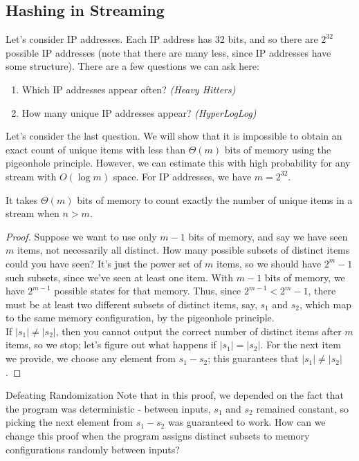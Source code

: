 \documentclass{notes}
\begin{document}
\subsection{Hashing in Streaming}
Let's consider IP addresses. Each IP address has 32 bits, and so there are $2^{32}$ possible IP addresses
(note that there are many less, since IP addresses have some structure). There are a few questions we
can ask here:

\begin{enumerate}[itemsep=0em]
  \item Which IP addresses appear often? \emph{(Heavy Hitters)} 
  \item How many unique IP addresses appear? \emph{(HyperLogLog)} 
\end{enumerate}

Let's consider the last question. We will show that it is impossible to obtain an exact count of unique 
items with less than $\Theta(m)$ bits of memory using the pigeonhole principle. However, we can estimate this
with high probability for any stream with $O(\log{m})$ space. For IP addresses, we have $m = 2^{32}$. 

\begin{proposition}
  It takes $\Theta(m)$ bits of memory to count exactly the number of unique items in a stream when 
  $n > m$.
\end{proposition}
\begin{proof}
  Suppose we want to use only $m-1$ bits of memory, and say we have seen $m$ items, not necessarily 
  all distinct. How many possible subsets of distinct items could you have seen? It's just the power
  set of $m$ items, so we should have $2^m - 1$ such subsets, since we've seen at least one item. With 
  $m-1$ bits of memory, we have $2^{m-1}$ possible states for that memory. Thus, since $2^{m-1} < 2^m - 1$,
  there must be at least two different subsets of distinct items, say, $s_1$ and $s_2$, which map to
  the same memory configuration, by the pigeonhole principle. \\

  If $|s_1| \neq |s_2|$, then you cannot output the correct number of distinct items after $m$ items,
  so we stop; let's figure out what happens if $|s_1| = |s_2|$. For the next item we provide, we choose
  any element from $s_1 - s_2$; this guarantees that $|s_1| \neq |s_2|$. 
\end{proof}

\begin{aside}{Defeating Randomization}
  Note that in this proof, we depended on the fact that the program was deterministic - between inputs,
  $s_1$ and $s_2$ remained constant, so picking the next element from $s_1 - s_2$ was guaranteed to work.
  How can we change this proof when the program assigns distinct subsets to memory configurations 
  randomly between inputs?
\end{aside}
\end{document}
